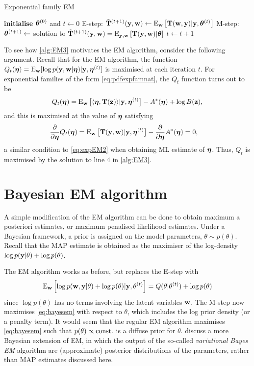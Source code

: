 \begin{algorithm}[hbt]
\caption{Exponential family EM}\label{alg:EM3}
\begin{algorithmic}[1]
  \State \textbf{initialise} ${\bm\theta}^{(0)}$ and $t\gets 0$
    \State E-step: $\tilde{{\mathbf T}}^{(t+1)}({\mathbf y},{\mathbf w}) \gets \operatorname{E}_{\mathbf w} \big[ {\mathbf T}({\mathbf w},{\mathbf y}) | {\mathbf y}, {\bm\theta}^{(t)} \big]$
    \State M-step: ${\bm\theta}^{(t+1)} \gets$ solution to $\tilde{{\mathbf T}}^{(t+1)}({\mathbf y},{\mathbf w}) = \operatorname{E}_{{\mathbf y},{\mathbf w}}\left[ {\mathbf T}({\mathbf y},{\mathbf w}) | {\bm\theta} \right]$
    \State $t \gets t + 1$
  \EndWhile
\end{algorithmic}
\end{algorithm}

To see how \cref{alg:EM3} motivates the EM algorithm, consider the following argument.
Recall that for the EM algorithm, the function $Q_t({\bm\eta}) = \operatorname{E}_{\mathbf w}[\log p({\mathbf y},{\mathbf w}|{\bm\eta}) | {\mathbf y},{\bm\eta}^{(t)}]$ is maximised at each iteration $t$.
For exponential families of the form \cref{eq:pdfexpfamnat}, the $Q_t$ function turns out to be
\[
 Q_t({\bm\eta}) = \operatorname{E}_{\mathbf w} \big[ \langle{\bm\eta}, {\mathbf T}({\mathbf z})\rangle | {\mathbf y},{\bm\eta}^{(t)} \big] -  A^*({\bm\eta}) + \log B({\mathbf z}),
\]
and this is maximised at the value of ${\bm\eta}$ satisfying
\begin{align*}
  \frac{\partial}{\partial{\bm\eta}} Q_t({\bm\eta})
  &= \operatorname{E}_{\mathbf w} \big[ {\mathbf T}({\mathbf y},{\mathbf w}) | {\mathbf y},{\bm\eta}^{(t)} \big] - \frac{\partial}{\partial{\bm\eta}}A^*({\bm\eta}) = 0,
\end{align*}
a similar condition to \cref{eq:expEM2} when obtaining ML estimate of ${\bm\eta}$.
Thus, $Q_t$ is maximised by the solution to line 4 in  \cref{alg:EM3}.

\section{Bayesian EM algorithm}

A simple modification of the EM algorithm can be done to obtain maximum a posteriori estimates, or maximum penalised likelihood estimates.
Under a Bayesian framework, a prior is assigned on the model parameters, $\theta\sim p(\theta)$.
Recall that the MAP estimate is obtained as the maximiser of the log-density $\log p({\mathbf y}|\theta) + \log p(\theta)$.

The EM algorithm works as before, but replaces the E-step with 
\begin{equation}\label{eq:bayesem}
  \operatorname{E}_{\mathbf w} \left[\log p({\mathbf w},{\mathbf y}|\theta) + \log p(\theta) | {\mathbf y}, \theta^{(t)} \right]
  = Q(\theta|\theta^{(t)}) + \log p(\theta)
\end{equation}
since $\log p(\theta)$ has no terms involving the latent variables ${\mathbf w}$.
The M-step now maximises \cref{eq:bayesem} with respect to $\theta$, which includes the log prior density (or a penalty term).
It would seem that the regular EM algorithm maximises \cref{eq:bayesem} such that $p(\theta) \propto \text{const.}\hspace{0.01em}$ is a diffuse prior for $\theta$.
\citet{beal2003} discuss a more Bayesian extension of EM, in which the output of the so-called \emph{variational Bayes EM} algorithm are (approximate) posterior distributions of the parameters, rather than MAP estimates discussed here.

